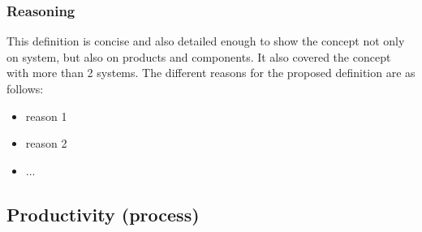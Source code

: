 \documentclass[letterpaper, cleveref]{lipics-v2019}
\newcommand{\authornote}[3]{\textcolor{#1}{[#3 ---#2]}}
\newcommand{\authornote}[3]{}
\newcommand{\ad}[1]{\authornote{cyan}{AD}{#1}} %
\newcommand{\notdone}[1]{\textcolor{red}{#1}}
\theoremstyle{definition}
\begin{document}
\subsubsection*{Reasoning}

This definition is concise and also detailed enough to show the concept not only
on system, but also on products and components. It also covered the concept with
more than 2 systems.  The different reasons for the proposed definition are as
follows:

\begin{itemize}
  \item reason 1
  \item reason 2
  \item ...
\end{itemize}


\subsection{Productivity (process)} %
\end{document}
